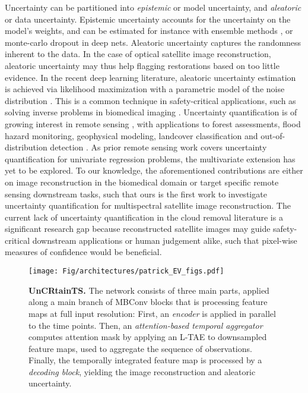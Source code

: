 \documentclass[10pt,twocolumn,letterpaper]{article}
\let\oldtextbf\textbf
\renewcommand{\textbf}[1]{\oldtextbf{\boldmath #1}}
\begin{document}
Uncertainty can be partitioned into \emph{epistemic} or model uncertainty, and \emph{aleatoric} or data uncertainty. Epistemic uncertainty accounts for the uncertainty on the model's weights, and can be estimated for instance with ensemble methods \cite{lakshminarayanan2017simple, turkoglu2022filmensemble}, or monte-carlo dropout \cite{gal2016dropout} in deep nets. 
Aleatoric uncertainty captures the randomness inherent to the data. In the case of optical satellite image reconstruction, aleatoric uncertainty may thus help flagging restorations based on too little evidence. 
In the recent deep learning literature, aleatoric uncertainty estimation is achieved via likelihood maximization with a parametric model of the noise distribution \cite{takahashi2018student, skafte2019reliable, seitzer2021pitfalls, ansariautoinverse, stirn2022faithful}. This is a common technique in safety-critical applications, such as solving inverse problems in biomedical imaging \cite{bhadra2021hallucinations, edupuganti2020uncertainty, laves2020uncertainty, laves2020well, tolle2021mean, antoran2022bayesdip, chung2022mr, glaubitz2023generalized}.
Uncertainty quantification is of growing interest in remote sensing \cite{gawlikowski2021survey}, with applications to forest assessments, flood hazard monitoring, geophysical modeling, landcover classification and out-of-distribution detection \cite{lang2022global, lang2022high, chaudhary2022flood, liu2022uncertainty, gawlikowski2022robust, gawlikowski2022advanced}. 
As prior remote sensing work covers uncertainty quantification for univariate regression problems, the multivariate extension has yet to be explored. 
To our knowledge, the aforementioned contributions are either on image reconstruction in the biomedical domain or target specific remote sensing downstream tasks, such that ours is the first work to investigate uncertainty quantification for multispectral satellite image reconstruction. 
The current lack of uncertainty quantification in the cloud removal literature is a significant research gap because reconstructed satellite images may guide safety-critical downstream applications or human judgement alike, such that pixel-wise measures of confidence would be beneficial. 


\begin{figure*}[ht!]
    \texttt{[image: Fig/architectures/patrick\_EV\_figs.pdf]}
    \caption{ \textbf{UnCRtainTS.}
    The network consists of three main parts, applied along a main branch of 
    MBConv blocks \cite{sandler2018mobilenetv2} that is processing feature maps at full input resolution: First, an \textit{encoder} is applied in parallel to the  time points. Then, an \textit{attention-based temporal aggregator} computes attention mask by applying an L-TAE to downsampled feature maps, used to aggregate the sequence of observations. Finally, the temporally integrated feature map is processed by a \textit{decoding block}, yielding the image reconstruction and aleatoric uncertainty.
    }
    \label{fig:architecture_uncrtaints}
\end{figure*}
\end{document}

